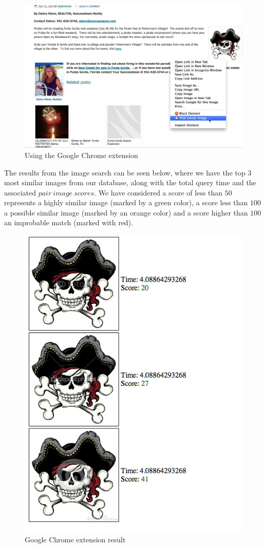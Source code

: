 \begin{figure}[ht!]
\centering
\includegraphics[width=.9\linewidth]{images/extension.png}
\caption{Using the Google Chrome extension}
\end{figure}

The results from the image search can be seen below, where we have the top 3 most similar images from our database, along with the total query time and the associated $pair\ image\ scores$. We have considered a score of less than $50$ represents a highly similar image (marked by a green color), a score less than $100$ a possible similar image (marked by an orange color) and a score higher than $100$ an improbable match (marked with red). 

\begin{figure}[ht!]
\centering
\includegraphics[width=.5\linewidth]{images/extensionResult.png}
\caption{Google Chrome extension result}
\end{figure}


